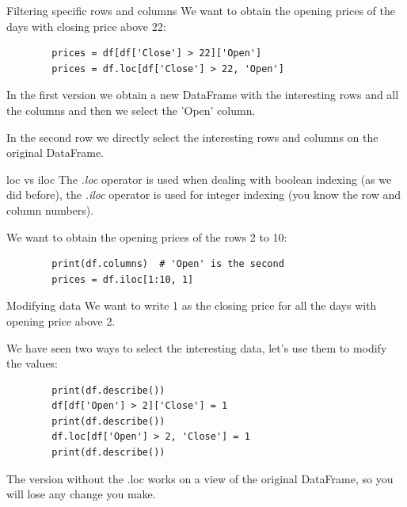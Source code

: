 \documentclass[aspectratio=169,handout]{beamer}
\begin{document}
\begin{frame}[fragile]{Filtering specific rows and columns}
    We want to obtain the opening prices of the days with closing price above 22:
    \begin{verbatim}
        prices = df[df['Close'] > 22]['Open']
        prices = df.loc[df['Close'] > 22, 'Open']
    \end{verbatim}

    In the first version we obtain a new DataFrame with the interesting rows and all the columns and then we select the
    'Open' column.

    In the second row we directly select the interesting rows and columns on the original DataFrame.
\end{frame}

\begin{frame}[fragile]{loc vs iloc}
    The \emph{.loc} operator is used when dealing with boolean indexing (as we did before), the \emph{.iloc} operator is
    used for integer indexing (you know the row and column numbers).

    We want to obtain the opening prices of the rows 2 to 10:
    \begin{verbatim}
        print(df.columns)  # 'Open' is the second
        prices = df.iloc[1:10, 1]
    \end{verbatim}
\end{frame}

\begin{frame}[fragile]{Modifying data}
    We want to write 1 as the closing price for all the days with opening price above 2.

    We have seen two ways to select the interesting data, let's use them to modify the values:
    \begin{verbatim}
        print(df.describe())
        df[df['Open'] > 2]['Close'] = 1
        print(df.describe())
        df.loc[df['Open'] > 2, 'Close'] = 1
        print(df.describe())
    \end{verbatim}

    \pause
    The version without the .loc works on a view of the original DataFrame, so you will lose any change you make.
\end{frame}
\end{document}
